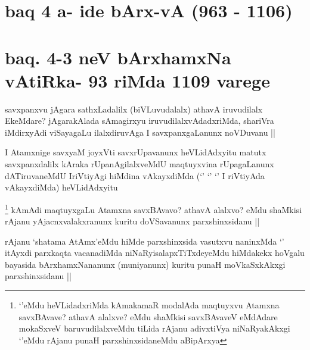 \section*{baq 4 a- ide bArx-vA (963 - 1106)}

\section*{baq. 4-3 neV bArxhamxNa vAtiRka- 93 riMda 1109 varege}


\begin{artha}
savxpanxvu jAgara sathxLadalilx (biVLuvudalalx) athavA iruvudilalx EkeMdare? jAgarakAlada sAmagirxyu iruvudilalxvAdadxriMda, shariVra iMdirxyAdi viSayagaLu ilalxdiruvAga I savxpanxgaLanunx noVDuvanu ||
\end{artha}


\begin{artha}
I Atamxnige savxyaM joyxVti savxrUpavanunx heVLidAdxyitu matutx savxpanxdalilx kAraka rUpanAgilalxveMdU maqtuyxvina rUpagaLanunx dATiruvaneMdU IriVtiyAgi hiMdina vAkayxdiMda (`\stext' `\stext' `\stext' I riVtiyAda vAkayxdiMda) heVLidAdxyitu
\end{artha}


\begin{artha}
\footnote{`\stext'eMdu heVLidadxriMda kAmakamaR modalAda maqtuyxvu Atamxna savxBAvave? athavA alalxve? eMdu shaMkisi savxBAvaveV eMdAdare mokaSxveV baruvudilalxveMdu tiLida rAjanu adivxtiVya niNaRyakAkxgi `\stext'eMdu rAjanu punaH parxshinxsidaneMdu aBipArxya}
kAmAdi maqtuyxgaLu Atamxna savxBAvavo? athavA alalxvo? eMdu shaMkisi rAjanu yAjacnxvalakxranunx kuritu doVSavanunx parxshinxsidanu ||
\end{artha}

\begin{artha}
rAjanu `shatama AtAmx'eMdu hiMde parxshinxsida vasutxvu naninxMda `\stext' itAyxdi parxkaqta vacanadiMda niNaRyisalapxTiTxdeyeMdu hiMdakekx hoVgalu bayasida bArxhamxNananunx (muniyanunx) kuritu punaH moVkaSxkAkxgi parxshinxsidanu ||
\end{artha}



